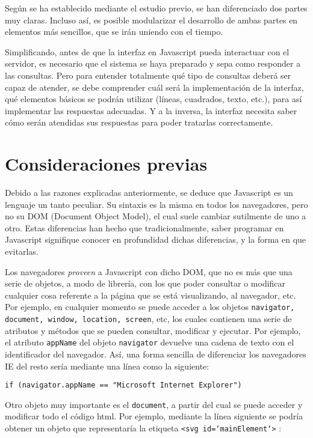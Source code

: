 Según se ha establecido mediante el estudio previo, se han diferenciado dos partes muy claras. Incluso así, es posible modularizar el desarrollo de ambas partes en elementos más sencillos, que se irán uniendo con el tiempo.

Simplificando, antes de que la interfaz en Javascript pueda interactuar con el servidor, es necesario que el sistema se haya preparado y sepa como responder a las consultas. Pero para entender totalmente qué tipo de consultas deberá ser capaz de atender, se debe comprender cuál será la implementación de la interfaz, qué elementos básicos se podrán utilizar (líneas, cuadrados, texto, etc.), para así implementar las respuestas adecuadas. Y a la inversa, la interfaz necesita saber cómo serán atendidas sus respuestas para poder tratarlas correctamente.

\section{Consideraciones previas}
Debido a las razones explicadas anteriormente, se deduce que Javascript es un lenguaje un tanto peculiar. Su sintaxis es la misma en todos los navegadores, pero no su DOM (Document Object Model), el cual suele cambiar sutilmente de uno a otro. Estas diferencias han hecho que tradicionalmente, saber programar en Javascript signifique conocer en profundidad dichas diferencias, y la forma en que evitarlas.

Los navegadores \emph{proveen} a Javascript con dicho DOM, que no es más que una serie de objetos, a modo de librería, con los que poder consultar o modificar cualquier cosa referente a la página que se está visualizando, al navegador, etc. Por ejemplo, en cualquier momento se puede acceder a los objetos \texttt{navigator, document, window, location, screen}, etc, los cuales contienen una serie de atributos y métodos que se pueden consultar, modificar y ejecutar. Por ejemplo, el atributo \texttt{appName} del objeto \texttt{navigator} devuelve una cadena de texto con el identificador del navegador. Así, una forma sencilla de diferenciar los navegadores IE del resto sería mediante una línea como la siguiente:

\begin{verbatim}
if (navigator.appName == "Microsoft Internet Explorer") 
\end{verbatim}

Otro objeto muy importante es el \texttt{document}, a partir del cual se puede acceder y modificar todo el código html. Por ejemplo, mediante la línea siguiente se podría obtener un objeto que representaría la etiqueta \texttt{<svg id=`mainElement`>} :

